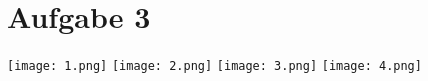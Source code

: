\newpage\section{Aufgabe 3}
\newpage\texttt{[image: 1.png]}
\newpage\texttt{[image: 2.png]}
\newpage\texttt{[image: 3.png]}
\newpage\texttt{[image: 4.png]}